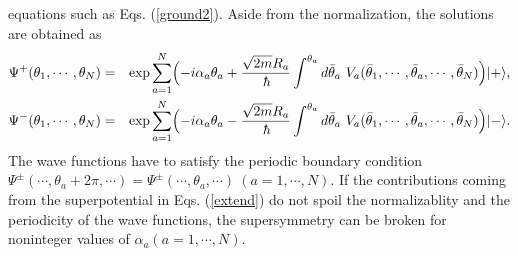 \documentclass[a4paper,12pt]{article}
\begin{document}
{equations such as Eqs. (\ref{ground2}). 
Aside from the normalization, the solutions 
are obtained as
\begin{eqnarray}
\Psi^{+}(\theta_1,\cdots, \theta_N)&=&
{\rm exp}\sum_{a=1}^N\Bigl(-i\alpha_a\theta_a 
+{{\sqrt{2m}R_a}\over \hbar}\int^{\theta_a}d{\bar\theta}_a~
V_a({\bar\theta}_1,\cdots, {\bar\theta}_a, \cdots, {\bar\theta}_N)\Bigr)
\ket{+},
\nonumber\\
\Psi^{-}(\theta_1, \cdots, \theta_N)&=&
{\rm exp}\sum_{a=1}^N\Bigl(-i\alpha_a\theta_a 
-{{\sqrt{2m}R_a}\over \hbar}\int^{\theta_a}d{\bar\theta}_a~
V_a({\bar\theta}_1,\cdots, {\bar\theta}_a, \cdots, {\bar\theta}_N)\Bigr)
\ket{-}.
\label{extend}
\end{eqnarray} 
The wave functions have to satisfy the periodic boundary condition
$\Psi^{\pm}(\cdots, \theta_a+2\pi, \cdots)
=\Psi^{\pm}(\cdots, \theta_a, \cdots)~(a=1,\cdots, N)$.
If the contributions coming from the superpotential in Eqs. (\ref{extend}) 
do not spoil the normalizablity and the periodicity of 
the wave functions, the supersymmetry can be broken
for noninteger values of $\alpha_a (a=1, \cdots, N)$.  
\par
}
\end{document}
